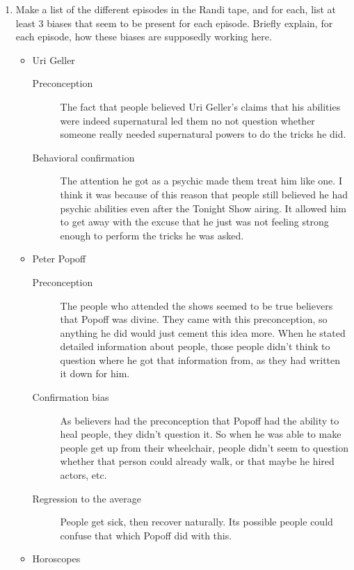 \documentclass[10pt, a4paper]{article}
\begin{document}

\begin{enumerate}
  \item Make a list of the different episodes in the Randi tape, and for each, list at least 3 biases that seem to be present for each episode. Briefly explain, for each episode, how these biases are supposedly working here.
    \begin{itemize}
      \item Uri Geller
        \begin{description}
          \item[Preconception] The fact that people believed Uri Geller's claims that his abilities were indeed supernatural led them no not question whether someone really needed supernatural powers to do the tricks he did.
          \item[Behavioral confirmation] The attention he got as a psychic made them treat him like one. I think it was because of this reason that people still believed he had psychic abilities even after the Tonight Show airing. It allowed him to get away with the excuse that he just was not feeling strong enough to perform the tricks he was asked.
        \end{description}
      \item Peter Popoff
        \begin{description}
          \item[Preconception] The people who attended the shows seemed to be true believers that Popoff was divine. They came with this preconception, so anything he did would just cement this idea more. When he stated detailed information about people, those people didn't think to question where he got that information from, as they had written it down for him.
          \item[Confirmation bias] As believers had the preconception that Popoff had the ability to heal people, they didn't question it. So when he was able to make people get up from their wheelchair, people didn't seem to question whether that person could already walk, or that maybe he hired actors, etc.
          \item[Regression to the average] People get sick, then recover naturally. Its possible people could confuse that which Popoff did with this.
        \end{description}
      \item Horoscopes
        \begin{description}

\end{description}
\end{itemize}
\end{enumerate}
\end{document}
